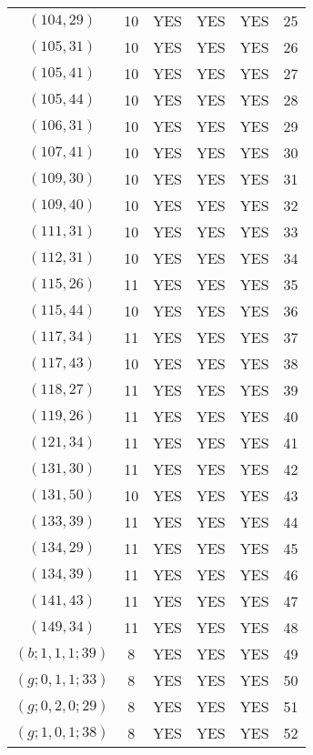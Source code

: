 \begin{longtable}{|c|c|c|c|c|c|}
$(104, 29)$ & 10 & YES & YES & YES & 25\\
$(105, 31)$ & 10 & YES & YES & YES & 26\\
$(105, 41)$ & 10 & YES & YES & YES & 27\\
$(105, 44)$ & 10 & YES & YES & YES & 28\\
$(106, 31)$ & 10 & YES & YES & YES & 29\\
$(107, 41)$ & 10 & YES & YES & YES & 30\\
$(109, 30)$ & 10 & YES & YES & YES & 31\\
$(109, 40)$ & 10 & YES & YES & YES & 32\\
$(111, 31)$ & 10 & YES & YES & YES & 33\\
$(112, 31)$ & 10 & YES & YES & YES & 34\\
$(115, 26)$ & 11 & YES & YES & YES & 35\\
$(115, 44)$ & 10 & YES & YES & YES & 36\\
$(117, 34)$ & 11 & YES & YES & YES & 37\\
$(117, 43)$ & 10 & YES & YES & YES & 38\\
$(118, 27)$ & 11 & YES & YES & YES & 39\\
$(119, 26)$ & 11 & YES & YES & YES & 40\\
$(121, 34)$ & 11 & YES & YES & YES & 41\\
$(131, 30)$ & 11 & YES & YES & YES & 42\\
$(131, 50)$ & 10 & YES & YES & YES & 43\\
$(133, 39)$ & 11 & YES & YES & YES & 44\\
$(134, 29)$ & 11 & YES & YES & YES & 45\\
$(134, 39)$ & 11 & YES & YES & YES & 46\\
$(141, 43)$ & 11 & YES & YES & YES & 47\\
$(149, 34)$ & 11 & YES & YES & YES & 48\\
$(b; 1, 1, 1; 39)$ & 8 & YES & YES & YES & 49\\
$(g; 0, 1, 1; 33)$ & 8 & YES & YES & YES & 50\\
$(g; 0, 2, 0; 29)$ & 8 & YES & YES & YES & 51\\
$(g; 1, 0, 1; 38)$ & 8 & YES & YES & YES & 52
\end{longtable}
